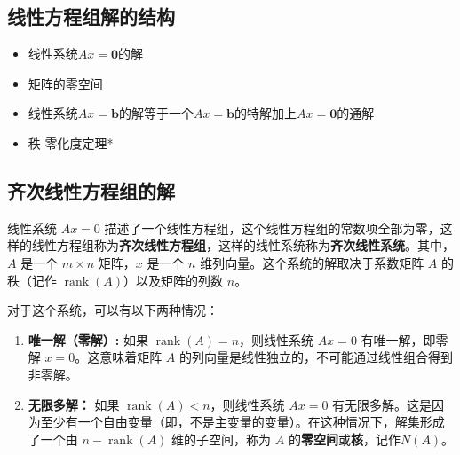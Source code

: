 
% 

\subsection{线性方程组解的结构}

\begin{note}
    \begin{itemize}
        \item 线性系统$Ax=\boldsymbol{0}$的解
        \item 矩阵的零空间
        \item 线性系统$Ax=\boldsymbol{b}$的解等于一个$Ax=\boldsymbol{b}$的特解加上$Ax=\boldsymbol{0}$的通解
        \item 秩-零化度定理*
    \end{itemize}
\end{note}

\subsection{齐次线性方程组的解}

线性系统 $Ax = 0$ 描述了一个线性方程组，这个线性方程组的常数项全部为零，这样的线性方程组称为\textcolor{third}{\bf 齐次线性方程组}，这样的线性系统称为\textcolor{third}{\bf 齐次线性系统}。其中，$A$ 是一个 $m \times n$ 矩阵，$x$ 是一个 $n$ 维列向量。这个系统的解取决于系数矩阵 $A$ 的秩（记作 $\operatorname{rank}(A)$）以及矩阵的列数 $n$。

对于这个系统，可以有以下两种情况：

\begin{enumerate}
    \item \textbf{唯一解（零解）:}
   如果 $\operatorname{rank}(A) = n$，则线性系统 $Ax = 0$ 有唯一解，即零解 $x = 0$。这意味着矩阵 $A$ 的列向量是线性独立的，不可能通过线性组合得到非零解。
   \item \textbf{无限多解：}
   如果 $\operatorname{rank}(A) < n$，则线性系统 $Ax = 0$ 有无限多解。这是因为至少有一个自由变量（即，不是主变量的变量）。在这种情况下，解集形成了一个由 $n - \operatorname{rank}(A)$ 维的子空间，称为 $A$ 的\textcolor{third}{\bf 零空间}或\textcolor{third}{\bf 核}，记作$N(A)$。
\end{enumerate}

